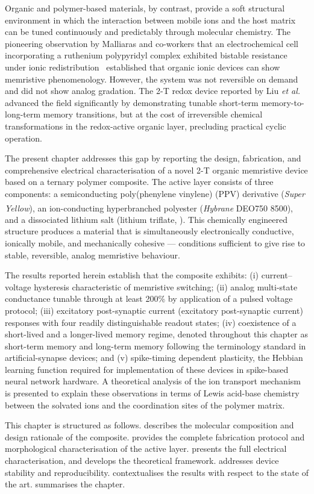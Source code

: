 \documentclass[12pt, a4paper, twoside]{report}
\newcommand{\SY}{\textit{Super Yellow}}
\newcommand{\Hybrane}{\textit{Hybrane}\textsuperscript{\textregistered} DEO750 8500}
\newcommand{\LiTf}{\ce{LiCF3SO3}}
\newcommand{\STM}{short-term memory}
\newcommand{\LTM}{long-term memory}
\newcommand{\STDP}{spike-timing dependent plasticity}
\newcommand{\EPSC}{excitatory post-synaptic current}
\begin{document}
Organic and polymer-based materials, by contrast, provide a soft structural environment in which the interaction between mobile ions and the host matrix can be tuned continuously and predictably through molecular chemistry. The pioneering observation by Malliaras and co-workers that an electrochemical cell incorporating a ruthenium polypyridyl complex exhibited bistable resistance under ionic redistribution~\cite{Zakhidov2010} established that organic ionic devices can show memristive phenomenology. However, the system was not reversible on demand and did not show analog gradation. The 2-T redox device reported by Liu \textit{et al.}~\cite{Liu2016} advanced the field significantly by demonstrating tunable \STM{}-to-\LTM{} transitions, but at the cost of irreversible chemical transformations in the redox-active organic layer, precluding practical cyclic operation.

The present chapter addresses this gap by reporting the design, fabrication, and comprehensive electrical characterisation of a novel 2-T organic memristive device based on a ternary polymer composite. The active layer consists of three components: a semiconducting poly(phenylene vinylene) (PPV) derivative (\SY{}), an ion-conducting hyperbranched polyester (\Hybrane{}), and a dissociated lithium salt (lithium triflate, \LiTf{}). This chemically engineered structure produces a material that is simultaneously electronically conductive, ionically mobile, and mechanically cohesive — conditions sufficient to give rise to stable, reversible, analog memristive behaviour.

The results reported herein establish that the composite exhibits: (i) current–voltage hysteresis characteristic of memristive switching; (ii) analog multi-state conductance tunable through at least 200\% by application of a pulsed voltage protocol; (iii) excitatory post-synaptic current (\EPSC{}) responses with four readily distinguishable readout states; (iv) coexistence of a short-lived and a longer-lived memory regime, denoted throughout this chapter as \STM{} and \LTM{} following the terminology standard in artificial-synapse devices; and (v) \STDP{}, the Hebbian learning function required for implementation of these devices in spike-based neural network hardware. A theoretical analysis of the ion transport mechanism is presented to explain these observations in terms of Lewis acid-base chemistry between the solvated ions and the coordination sites of the polymer matrix.

This chapter is structured as follows.  describes the molecular composition and design rationale of the composite.  provides the complete fabrication protocol and morphological characterisation of the active layer.  presents the full electrical characterisation, and  develops the theoretical framework.  addresses device stability and reproducibility.  contextualises the results with respect to the state of the art.  summarises the chapter.
\end{document}
